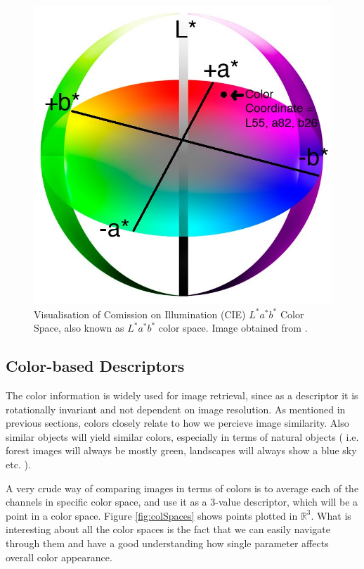 \documentclass{report}
\begin{document}
\begin{figure}[hbtp]
 \centering
 \caption{Visualisation of Comission on Illumination (CIE) $L^*a^*b^*$ Color Space, also known as $L^*a^*b^*$ color space. Image obtained from \cite{lab_blogspot}.}
 \includegraphics[scale=0.17]{graphics/lab_space.jpg}
\end{figure}
 


\subsection{Color-based Descriptors}
The color information is widely used for image retrieval, since as a descriptor it is rotationally invariant and not dependent on image resolution. As mentioned in previous sections, colors closely relate to how we percieve image similarity. Also similar objects will yield similar colors, especially in terms of natural objects ( i.e. forest images will always be mostly green, landscapes will always show a blue sky etc. ). 

A very crude way of comparing images in terms of colors is to average each of the channels in specific color space, and use it as a $3$-value descriptor, which will be a point in a color space. Figure \ref{fig:colSpaces} shows points plotted in $\mathbb{R}^3$. What is interesting about all the color spaces is the fact that we can easily navigate through them and have a good understanding how single parameter affects overall color appearance.
\end{document}
